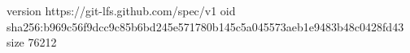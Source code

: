 version https://git-lfs.github.com/spec/v1
oid sha256:b969c56f9dcc9c85b6bd245e571780b145c5a045573aeb1e9483b48c0428fd43
size 76212
